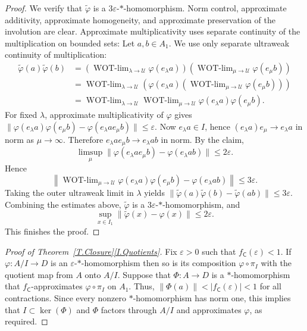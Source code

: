 \documentclass[11pt]{amsproc}
\DeclareMathOperator{\WOTlim}{WOT-\lim}
\newcommand{\sfC}{\mathsf C}
\newcommand{\cU}{\mathcal U}
\theoremstyle{definition}
\theoremstyle{plain}
\theoremstyle{remark}
\begin{document}
\begin{proof}
We verify that $\widetilde\varphi$ is a
$3\varepsilon$-$*$-homomorphism. Norm control, approximate additivity, approximate homogeneity, and approximate preservation of the involution are clear.
Approximate multiplicativity uses separate continuity of the multiplication on bounded sets: Let $a,b\in A_1$. We use only separate ultraweak continuity of multiplication:
\begin{align*}
\widetilde\varphi(a)\widetilde\varphi(b)
&=
\left(
\WOTlim_{\lambda\to\cU}\varphi(e_\lambda a)
\right)
\left(
\WOTlim_{\mu\to\cU}\varphi(e_\mu b)
\right) \\
&=
\WOTlim_{\lambda\to\cU}
\left(
\varphi(e_\lambda a)
\left(
\WOTlim_{\mu\to\cU}\varphi(e_\mu b)
\right)
\right) \\
&=
\WOTlim_{\lambda\to\cU}
\WOTlim_{\mu\to\cU}
\varphi(e_\lambda a)\varphi(e_\mu b).
\end{align*}
For fixed $\lambda$, approximate multiplicativity of $\varphi$ gives
$
\|\varphi(e_\lambda a)\varphi(e_\mu b)
-\varphi(e_\lambda a e_\mu b)\|
\leq \varepsilon.
$
Now $e_\lambda a\in I$, hence
$
(e_\lambda a)e_\mu\to e_\lambda a
$
in norm as $\mu\to\infty$. Therefore
$
e_\lambda a e_\mu b\to e_\lambda ab
$
in norm. By the claim,
\[
\limsup_\mu
\|\varphi(e_\lambda a e_\mu b)-\varphi(e_\lambda ab)\|
\leq 2\varepsilon.
\]
Hence
\[
\left\|
\WOTlim_{\mu\to\cU}
\varphi(e_\lambda a)\varphi(e_\mu b)
-\varphi(e_\lambda ab)
\right\|
\leq 3\varepsilon.
\]
Taking the outer ultraweak limit in $\lambda$ yields
$
\|\widetilde\varphi(a)\widetilde\varphi(b)
-\widetilde\varphi(ab)\|
\leq 3\varepsilon.
$
Combining the estimates above, $\widetilde\varphi$ is a
$3\varepsilon$-$*$-homomorphism, and
\[
\sup_{x\in I_1}
\|\widetilde\varphi(x)-\varphi(x)\|
\leq 2\varepsilon.
\]
This finishes the proof.
\end{proof}

\begin{proof}[Proof of Theorem~\ref{T.Closure}\eqref{I.Quotients}] Fix $\varepsilon>0$ such that $f_\sfC(\varepsilon)<1$. 
	If $\varphi\colon A/I\to D$ is an $\varepsilon$-$*$-homomorphism then so is its composition $\varphi\circ \pi_I$ with the quotient map from $A$ onto $A/I$. Suppose that  $\Phi\colon A\to D$ is a $*$-homomorphism that $f_{\sfC}$-approximates $\varphi\circ \pi_I$ on $A_1$. Thus, $\|\Phi(a)\| < |f_{\sfC}(\varepsilon)|<1$ for all contractions. Since every nonzero $*$-homomorphism has norm one, this implies that $I \subset \ker(\Phi)$ and $\Phi$ factors through $A/I$ and approximates $\varphi$, as required.   
\end{proof}
\end{document}

